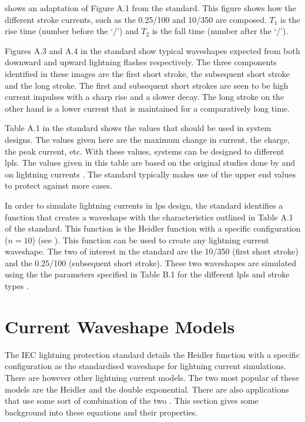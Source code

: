  shows an adaptation of Figure A.1 from the standard. This figure shows how the different stroke currents, such as the 0.25/100 and 10/350 are composed. $T_1$ is the rise time (number before the `/') and $T_2$ is the fall time (number after the `/').

Figures A.3 and A.4 in the standard show typical waveshapes expected from both downward and upward lightning flashes respectively. The three components identified in these images are the first short stroke, the subsequent short stroke and the long stroke. The first and subsequent short strokes are seen to be high current impulses with a sharp rise and a slower decay. The long stroke on the other hand is a lower current that is maintained for a comparatively long time.

Table A.1 in the standard shows the values that should be used in system designs. The values given here are the maximum change in current, the charge, the peak current, etc. With these values, systems can be designed to different \glspl{lpl}. The values given in this table are based on the original studies done by \citeauthor{Anderson1980} and \citeauthor{Berger1975} on lightning currents \cite{Anderson1980,Berger1975}. The standard typically makes use of the upper end values to protect against more cases.

In order to simulate lightning currents in \gls{lps} design, the standard identifies a function that creates a waveshape with the characteristics outlined in Table A.1 of the standard. This function is the Heidler function with a specific configuration ($n = 10$) (see ). This function can be used to create any lightning current waveshape. The two of interest in the standard are the 10/350 (first short stroke) and the 0.25/100 (subsequent short stroke). These two waveshapes are simulated using the the parameters specified in Table B.1 for the different \glspl{lpl} and stroke types \cite{IEC623051}.


\section{Current Waveshape Models}
\label{sec:background_current_waveshape_models}
The IEC lightning protection standard details the Heidler function with a specific configuration as the standardised waveshape for lightning current simulations. There are however other lightning current models. The two most popular of these models are the Heidler and the double exponential. There are also applications that use some sort of combination of the two \cite{Javor2011,Nucci2003,Pavanello2007}. This section gives some background into these equations and their properties.

